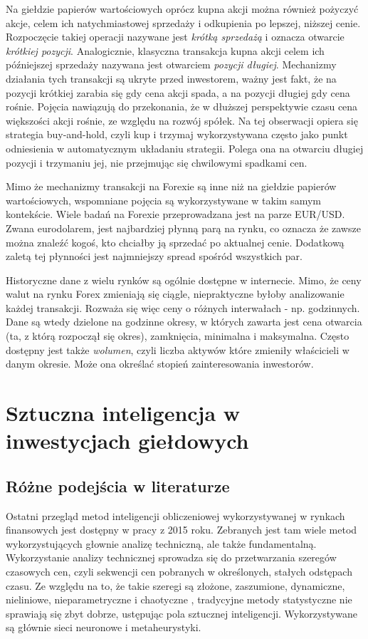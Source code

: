 \documentclass[twoside]{iisthesis}
\begin{document}
Na giełdzie papierów wartościowych oprócz kupna akcji można również pożyczyć akcje, celem ich natychmiastowej sprzedaży i odkupienia po lepszej, niższej cenie. Rozpoczęcie takiej operacji nazywane jest \textit{krótką sprzedażą} i oznacza otwarcie \textit{krótkiej pozycji}. Analogicznie, klasyczna transakcja kupna akcji celem ich późniejszej sprzedaży nazywana jest otwarciem \textit{pozycji długiej}. Mechanizmy działania tych transakcji są ukryte przed inwestorem, ważny jest fakt, że na pozycji krótkiej zarabia się gdy cena akcji spada, a na pozycji długiej gdy cena rośnie. Pojęcia nawiązują do przekonania, że w dłuższej perspektywie czasu cena większości akcji rośnie, ze względu na rozwój spółek. Na tej obserwacji opiera się strategia buy-and-hold, czyli kup i trzymaj wykorzystywana często jako punkt odniesienia w automatycznym układaniu strategii. Polega ona na otwarciu długiej pozycji i trzymaniu jej, nie przejmując się chwilowymi spadkami cen.

Mimo że mechanizmy transakcji na Forexie są inne niż na giełdzie papierów wartościowych, wspomniane pojęcia są wykorzystywane w takim samym kontekście. Wiele badań na Forexie przeprowadzana jest na parze EUR/USD. Zwana eurodolarem, jest najbardziej płynną parą na rynku, co oznacza że zawsze można znaleźć kogoś, kto chciałby ją sprzedać po aktualnej cenie. Dodatkową zaletą tej płynności jest najmniejszy spread spośród wszystkich par.

Historyczne dane z wielu rynków są ogólnie dostępne w internecie. Mimo, że ceny walut na rynku Forex zmieniają się ciągle, niepraktyczne byłoby analizowanie każdej transakcji. Rozważa się więc ceny o różnych interwałach - np. godzinnych. Dane są wtedy dzielone na godzinne okresy, w których zawarta jest cena otwarcia (ta, z którą rozpoczął się okres), zamknięcia, minimalna i maksymalna. Często dostępny jest także \textit{wolumen}, czyli liczba aktywów które zmieniły właścicieli w danym okresie. Może ona określać stopień zainteresowania inwestorów.



\chapter{Sztuczna inteligencja w inwestycjach giełdowych}

\section{Różne podejścia w literaturze}
Ostatni przegląd metod inteligencji obliczeniowej wykorzystywanej w rynkach finansowych jest dostępny w pracy \cite{Cavalcante2016194} z 2015 roku. Zebranych jest tam wiele metod wykorzystujących głownie analizę techniczną, ale także fundamentalną. Wykorzystanie analizy technicznej sprowadza się do przetwarzania szeregów czasowych cen, czyli sekwencji cen pobranych w określonych, stałych odstępach czasu. Ze względu na to, że takie szeregi są złożone, zaszumione, dynamiczne, nieliniowe, nieparametryczne i chaotyczne \cite{Si20132581}, tradycyjne metody statystyczne nie sprawiają się zbyt dobrze, ustępując pola sztucznej inteligencji. Wykorzystywane są głównie sieci neuronowe i metaheurystyki.
\end{document}
